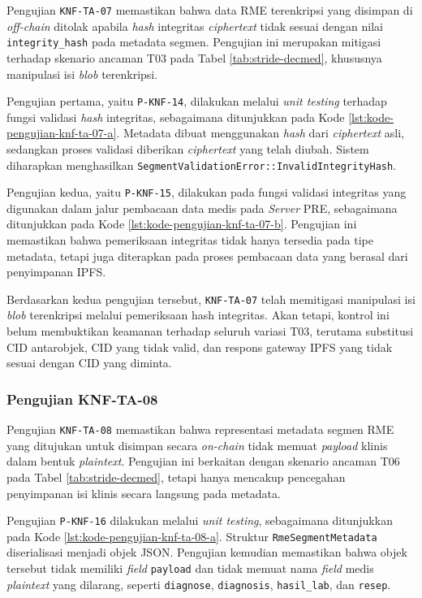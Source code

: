 Pengujian \texttt{KNF-TA-07} memastikan bahwa data RME terenkripsi yang disimpan di \textit{off-chain} ditolak apabila \textit{hash} integritas \textit{ciphertext} tidak sesuai dengan nilai \texttt{integrity\_hash} pada metadata segmen. Pengujian ini merupakan mitigasi terhadap skenario ancaman T03 pada Tabel \ref{tab:stride-decmed}, khususnya manipulasi isi \textit{blob} terenkripsi.

Pengujian pertama, yaitu \texttt{P-KNF-14}, dilakukan melalui \textit{unit testing} terhadap fungsi validasi \textit{hash} integritas, sebagaimana ditunjukkan pada Kode \ref{lst:kode-pengujian-knf-ta-07-a}. Metadata dibuat menggunakan \textit{hash} dari \textit{ciphertext} asli, sedangkan proses validasi diberikan \textit{ciphertext} yang telah diubah. Sistem diharapkan menghasilkan \texttt{SegmentValidationError::InvalidIntegrityHash}.

Pengujian kedua, yaitu \texttt{P-KNF-15}, dilakukan pada fungsi validasi integritas yang digunakan dalam jalur pembacaan data medis pada \textit{Server} PRE, sebagaimana ditunjukkan pada Kode \ref{lst:kode-pengujian-knf-ta-07-b}. Pengujian ini memastikan bahwa pemeriksaan integritas tidak hanya tersedia pada tipe metadata, tetapi juga diterapkan pada proses pembacaan data yang berasal dari penyimpanan IPFS.

Berdasarkan kedua pengujian tersebut, \texttt{KNF-TA-07} telah memitigasi manipulasi isi \textit{blob} terenkripsi melalui pemeriksaan hash integritas. Akan tetapi, kontrol ini belum membuktikan keamanan terhadap seluruh variasi T03, terutama substitusi CID antarobjek, CID yang tidak valid, dan respons gateway IPFS yang tidak sesuai dengan CID yang diminta.

\subsubsection{Pengujian KNF-TA-08}
\label{subsubsec:pengujian-knf-ta-08}

Pengujian \texttt{KNF-TA-08} memastikan bahwa representasi metadata segmen RME yang ditujukan untuk disimpan secara \textit{on-chain} tidak memuat \textit{payload} klinis dalam bentuk \textit{plaintext}. Pengujian ini berkaitan dengan skenario ancaman T06 pada Tabel \ref{tab:stride-decmed}, tetapi hanya mencakup pencegahan penyimpanan isi klinis secara langsung pada metadata.

Pengujian \texttt{P-KNF-16} dilakukan melalui \textit{unit testing}, sebagaimana ditunjukkan pada Kode \ref{lst:kode-pengujian-knf-ta-08-a}. Struktur \texttt{RmeSegmentMetadata} diserialisasi menjadi objek JSON. Pengujian kemudian memastikan bahwa objek tersebut tidak memiliki \textit{field} \texttt{payload} dan tidak memuat nama \textit{field} medis \textit{plaintext} yang dilarang, seperti \texttt{diagnose}, \texttt{diagnosis}, \texttt{hasil\_lab}, dan \texttt{resep}.

